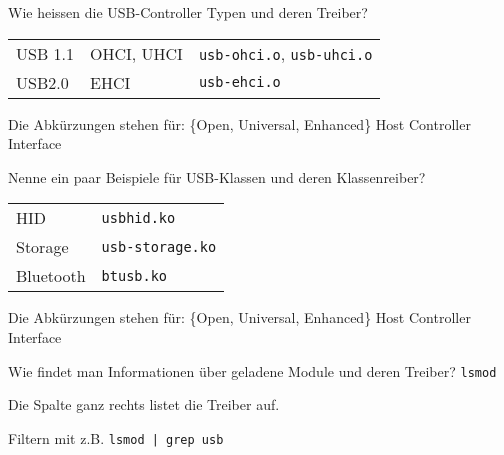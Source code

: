 \begin{flashcard}[Information]{Wie heissen die USB-Controller Typen und deren Treiber?}
	\begin{tabular}{lll}
		USB 1.1 & OHCI, UHCI & \texttt{usb-ohci.o}, \texttt{usb-uhci.o}\\
		USB2.0 & EHCI & \texttt{usb-ehci.o}\\
	\end{tabular}
	
	Die Abkürzungen stehen für: \{Open, Universal, Enhanced\} Host Controller Interface
\end{flashcard}


\begin{flashcard}[Information]{Nenne ein paar Beispiele für USB-Klassen und deren Klassenreiber?}
	\begin{tabular}{ll}
		HID 		& \texttt{usbhid.ko}\\
		Storage 	& \texttt{usb-storage.ko}\\
		Bluetooth 	& \texttt{btusb.ko}
	\end{tabular}
	
	Die Abkürzungen stehen für: \{Open, Universal, Enhanced\} Host Controller Interface
\end{flashcard}

\begin{flashcard}[Command]{Wie findet man Informationen über geladene Module und deren Treiber?}
	\texttt{lsmod}
	
	\begin{description}
	\item Die Spalte ganz rechts listet die Treiber auf.
	
	\item Filtern mit z.B. \texttt{lsmod | grep usb}
	\end{description}
	
	
	
	
\end{flashcard}

